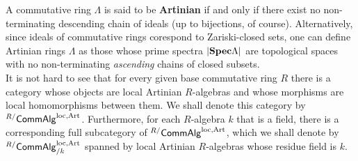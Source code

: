                 \begin{definition} \label{def: artinian_rings} 
                    A commutative ring $\Lambda$ is said to be \textbf{Artinian} if and only if there exist no non-terminating descending chain of ideals (up to bijections, of course). Alternatively, since ideals of commutative rings corespond to Zariski-closed sets, one can define Artinian rings $\Lambda$ as those whose prime spectra $|\mathbf{Spec} \Lambda|$ are topological spaces with no non-terminating \textit{ascending} chains of closed subsets. 
                    \\
                    It is not hard to see that for every given base commutative ring $R$ there is a category whose objects are local Artinian $R$-algebras and whose morphisms are local homomorphisms between them. We shall denote this category by ${}^{R/}\mathsf{Comm}\mathsf{Alg}^{\mathrm{loc}, \mathrm{Art}}$. Furthermore, for each $R$-algebra $k$ that is a field, there is a corresponding full subcategory of ${}^{R/}\mathsf{Comm}\mathsf{Alg}^{\mathrm{loc}, \mathrm{Art}}$, which we shall denote by ${}^{R/}\mathsf{Comm}\mathsf{Alg}_{/k}^{\mathrm{loc}, \mathrm{Art}}$ spanned by local Artinian $R$-algebras whose residue field is $k$. 
                \end{definition}
                
